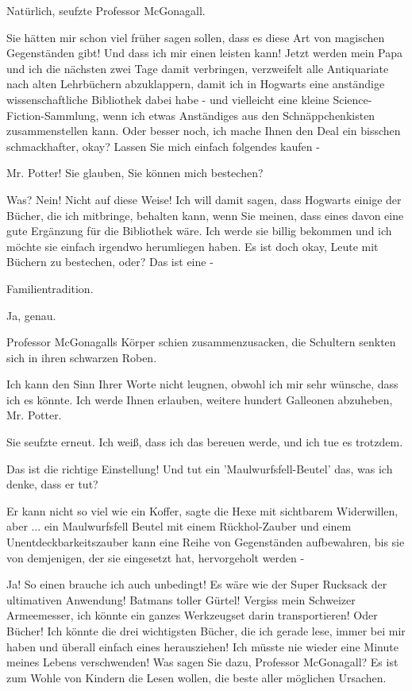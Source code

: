 \glqq{}Natürlich\grqq{}, seufzte Professor McGonagall.

\glqq{}Sie hätten mir schon viel früher sagen sollen, dass es diese Art von
magischen Gegenständen gibt! Und dass ich mir einen leisten kann! Jetzt werden
mein Papa und ich die nächsten zwei Tage damit verbringen, verzweifelt alle
Antiquariate nach alten Lehrbüchern abzuklappern, damit ich in Hogwarts eine
anständige wissenschaftliche Bibliothek dabei habe - und vielleicht eine kleine
Science-Fiction-Sammlung, wenn ich etwas Anständiges aus den Schnäppchenkisten
zusammenstellen kann. Oder besser noch, ich mache Ihnen den Deal ein bisschen
schmackhafter, okay? Lassen Sie mich einfach folgendes kaufen -\grqq{}

\glqq{}Mr. Potter! Sie glauben, Sie können mich bestechen?\grqq{}

\glqq{}Was? Nein! Nicht auf diese Weise! Ich will damit sagen, dass Hogwarts
einige der Bücher, die ich mitbringe, behalten kann, wenn Sie meinen, dass eines
davon eine gute Ergänzung für die Bibliothek wäre. Ich werde sie billig bekommen
und ich möchte sie einfach irgendwo herumliegen haben. Es ist doch okay, Leute
mit Büchern zu bestechen, oder? Das ist eine -\grqq{}

\glqq{}Familientradition.\grqq{}

\glqq{}Ja, genau.\grqq{}

Professor McGonagalls Körper schien zusammenzusacken, die Schultern senkten sich
in ihren schwarzen Roben.

\glqq{}Ich kann den Sinn Ihrer Worte nicht leugnen, obwohl ich mir sehr wünsche,
dass ich es könnte. Ich werde Ihnen erlauben, weitere hundert Galleonen
abzuheben, Mr. Potter.\grqq{}

Sie seufzte erneut. \glqq{}Ich weiß, dass ich das bereuen werde, und ich tue es
trotzdem.\grqq{}

\glqq{}Das ist die richtige Einstellung! Und tut ein 'Maulwurfsfell-Beutel' das,
was ich denke, dass er tut?\grqq{}

\glqq{}Er kann nicht so viel wie ein Koffer\grqq{}, sagte die Hexe mit sichtbarem
Widerwillen, \glqq{}aber ... ein Maulwurfsfell Beutel mit einem Rückhol-Zauber
und einem Unentdeckbarkeitszauber kann eine Reihe von Gegenständen aufbewahren,
bis sie von demjenigen, der sie eingesetzt hat, hervorgeholt werden -\grqq{}

\glqq{}Ja! So einen brauche ich auch unbedingt! Es wäre wie der Super Rucksack
der ultimativen Anwendung! Batmans toller Gürtel! Vergiss mein Schweizer
Armeemesser, ich könnte ein ganzes Werkzeugset darin transportieren! Oder
Bücher! Ich könnte die drei wichtigsten Bücher, die ich gerade lese, immer bei
mir haben und überall einfach eines herausziehen! Ich müsste nie wieder eine
Minute meines Lebens verschwenden! Was sagen Sie dazu, Professor McGonagall? Es
ist zum Wohle von Kindern die Lesen wollen, die beste aller möglichen
Ursachen.\grqq{}


